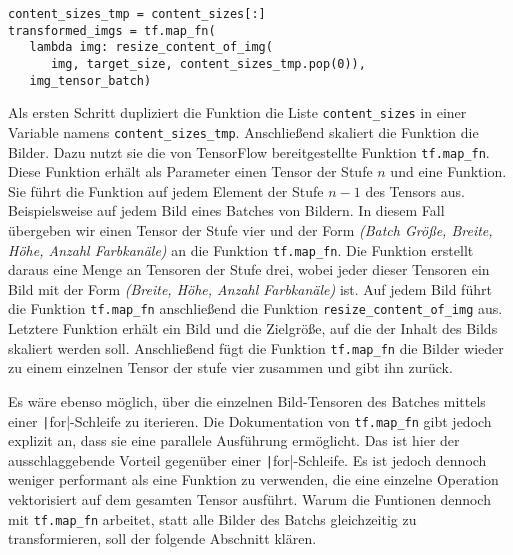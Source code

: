 \begin{code}
   \begin{verbatim}
content_sizes_tmp = content_sizes[:]
transformed_imgs = tf.map_fn(
   lambda img: resize_content_of_img(
      img, target_size, content_sizes_tmp.pop(0)), 
   img_tensor_batch)
\end{verbatim}
   \label{lst:content-scaling}
\end{code}

Als ersten Schritt dupliziert die Funktion die Liste \texttt{content_sizes} in einer Variable namens \texttt{content_sizes_tmp}. Anschließend skaliert die Funktion die Bilder. Dazu nutzt sie die von TensorFlow bereitgestellte Funktion \texttt{tf.map_fn}. Diese Funktion erhält als Parameter einen Tensor der Stufe $n$ und eine Funktion. Sie führt die Funktion auf jedem Element der Stufe $n-1$ des Tensors aus. Beispielsweise auf jedem Bild eines Batches von Bildern. In diesem Fall übergeben wir einen Tensor der Stufe vier und der Form \emph{(Batch Größe, Breite, Höhe, Anzahl Farbkanäle)} an die Funktion \texttt{tf.map_fn}. Die Funktion erstellt daraus eine Menge an Tensoren der Stufe drei, wobei jeder dieser Tensoren ein Bild mit der Form \emph{(Breite, Höhe, Anzahl Farbkanäle)} ist.
Auf jedem Bild führt die Funktion \texttt{tf.map_fn} anschließend die Funktion \texttt{resize_content_of_img} aus. Letztere Funktion erhält ein Bild und die Zielgröße, auf die der Inhalt des Bilds skaliert werden soll. Anschließend fügt die Funktion \texttt{tf.map_fn} die Bilder wieder zu einem einzelnen Tensor der stufe vier zusammen und gibt ihn zurück. \cite{tf-map-fn}

Es wäre ebenso möglich, über die einzelnen Bild-Tensoren des Batches mittels einer \texttt|for|-Schleife zu iterieren. Die Dokumentation von \texttt{tf.map_fn} gibt jedoch explizit an, dass sie eine parallele Ausführung ermöglicht. Das ist hier der ausschlaggebende Vorteil gegenüber einer \texttt|for|-Schleife. Es ist jedoch dennoch weniger performant als eine Funktion zu verwenden, die eine einzelne Operation vektorisiert auf dem gesamten Tensor ausführt. Warum die Funtionen dennoch mit \texttt{tf.map_fn} arbeitet, statt alle Bilder des Batchs gleichzeitig zu transformieren, soll der folgende Abschnitt klären. \cite{tf-map-fn}

